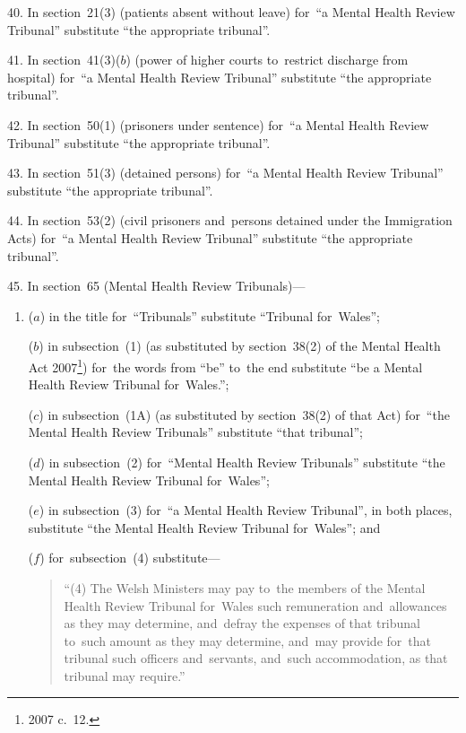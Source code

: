 \documentclass[12pt,a4paper]{article}
\begin{document}
\medskip

40.  In section~21(3) (patients absent without leave) for~“a Mental Health Review Tribunal” substitute “the appropriate tribunal”.

\medskip

41.  In section~41(3)($b$)  (power of higher courts to~restrict discharge from hospital) for~“a Mental Health Review Tribunal” substitute “the appropriate tribunal”.

\medskip

42.  In section~50(1) (prisoners under sentence) for~“a Mental Health Review Tribunal” substitute “the appropriate tribunal”.

\medskip

43.  In section~51(3) (detained persons) for~“a Mental Health Review Tribunal” substitute “the appropriate tribunal”.

\medskip

44.  In section~53(2) (civil prisoners and~persons detained under the Immigration Acts) for~“a Mental Health Review Tribunal” substitute “the appropriate tribunal”.

\medskip

45.  In section~65 (Mental Health Review Tribunals)—
\begin{enumerate}\item[]
($a$) in the title for~“Tribunals” substitute “Tribunal for~Wales”;

($b$) in subsection~(1) (as substituted by section~38(2) of the Mental Health Act 2007\footnote{2007 c.~12.}) for~the words from “be” to~the end substitute “be a Mental Health Review Tribunal for~Wales.”;

($c$) in subsection~(1A) (as substituted by section~38(2) of that Act) for~“the Mental Health Review Tribunals” substitute “that tribunal”;

($d$) in subsection~(2) for~“Mental Health Review Tribunals” substitute “the Mental Health Review Tribunal for~Wales”;

($e$) in subsection~(3) for~“a Mental Health Review Tribunal”, in both places, substitute “the Mental Health Review Tribunal for~Wales”; and

($f$) for~subsection~(4) substitute—
\begin{quotation}
“(4) The Welsh Ministers may pay to~the members of the Mental Health Review Tribunal for~Wales such remuneration and~allowances as they may determine, and~defray the expenses of that tribunal to~such amount as they may determine, and~may provide for~that tribunal such officers and~servants, and~such accommodation, as that tribunal may require.”
\end{quotation}
\end{enumerate}
\end{document}
